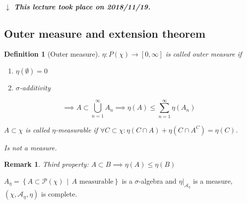 \documentclass[a4paper]{article}
\newcounter{lecref}[section]
\numberwithin{lecref}{section}
\theoremstyle{break}
\newtheorem{definition}[lecref]{Definition}
\newtheorem*{Remark}{Remark}
\newcommand{\dateref}[1]{%
  \begin{mdframed}[backgroundcolor=gray!10,innerbottommargin=0pt,innertopmargin=0pt]
    \paragraph{\textit{$\downarrow$ This lecture took place on #1.}}%
  \end{mdframed}%
}
\newcommand{\SetDef}[2]{\left\{#1\,\mid\,#2\right\}}
\begin{document}
\dateref{2018/11/19}

\subsection{Outer measure and extension theorem}
\begin{definition}[Outer measure]
  $\eta: P(\chi) \to [0, \infty]$ is called \emph{outer measure} if
  \begin{enumerate}
    \item $\eta(\emptyset) = 0$
    \item $\sigma$-additivity
  \end{enumerate}
  \[ \implies A \subset \bigcup_{n=1}^\infty A_n \implies \eta(A) \leq \sum_{n=1}^\infty \eta(A_n) \]

  $A \subset \chi$ is called $\eta$-measurable if $\forall C \subset \chi: \eta(C \cap A) + \eta(C \cap A^C) = \eta(C)$.

  Is not a measure.
\end{definition}

\begin{Remark}
  Third property: $A \subset B \implies \eta(A) \leq \eta(B)$
\end{Remark}

\begin{theorem}[Carathéodory]
  $A_\eta = \SetDef{A \subset \mathcal P(\chi)}{A \text{ measurable}}$ is a $\sigma$-algebra and $\left.\eta\right|_{\mathcal A_{\eta}}$ is a measure, $(\chi, \mathcal A_\eta, \eta)$ is complete.
\end{theorem}
\end{document}

